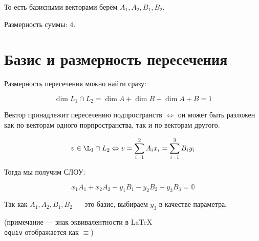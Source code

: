 \documentclass[12pt, a4paper]{article}
\begin{document}
    То есть базисными векторами берём $A_1, A_2, B_1, B_2$.

    Размерность суммы: $4$.

    \section{Базис и размерность пересечения}

    Размерность пересечения можно найти сразу:

    \begin{equation}
        \dim L_1 \cap L_2 = \dim A + \dim B - \dim A + B = 1
    \end{equation}

    Вектор принадлежит пересечению подпространств 
    $\Leftrightarrow$ он может быть разложен как 
    по векторам одного порпространства, так и по векторам другого.

    \begin{equation}
        v \in \L_1 \cap L_2 \Leftrightarrow v 
        = \sum_{i = 1}^2 A_i x_i 
        = \sum_{i = 1}^3 B_i y_i
    \end{equation}

    Тогда мы получим СЛОУ:
    
    \begin{equation}
        x_1 A_1 + x_2 A_2 - y_1 B_1 - y_2 B_2 - y_3 B_3 = \mathbb{0}
    \end{equation}

    Так как $A_1, A_2, B_1, B_2$ — это базис, выбираем $y_3$ в качестве параметра.

    (примечание — знак эквивалентности в LaTeX \texttt{\\equiv} 
    отображается как $\equiv$)
\end{document}
